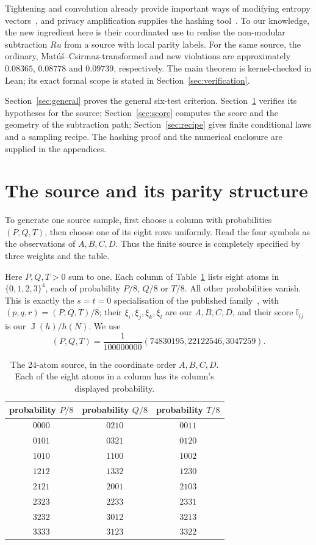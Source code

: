 \documentclass[a4paper,11pt]{article}
\newcommand{\Ing}{\operatorname{J}}
\begin{document}
Tightening and convolution already provide important ways of modifying
entropy vectors~\cite{Matus,MC}, and privacy amplification supplies the
hashing tool~\cite{BBCM,Csiszar96,RW}. To our knowledge, the new ingredient
here is their coordinated use to realise the non-modular subtraction
$Ru$ from a source with local parity labels. For the same source, the
ordinary, Mat\'u\v{s}--Csirmaz-transformed and new violations are
approximately $0.08365$, $0.08778$ and $0.09739$, respectively.
The main theorem is kernel-checked in Lean; its exact formal scope is
stated in Section~\ref{sec:verification}.

Section~\ref{sec:general} proves the general six-test criterion.
Section~\ref{sec:source} verifies its hypotheses for the source;
Section~\ref{sec:score} computes the score and the geometry of the
subtraction path; Section~\ref{sec:recipe} gives finite conditional laws
and a sampling recipe. The hashing proof and the numerical enclosure
are supplied in the appendices.



\section{The source and its parity structure}\label{sec:source}
To generate one source sample, first choose a column with probabilities
$(P,Q,T)$, then choose one of its eight rows uniformly. Read the four
symbols as the observations of $A,B,C,D$. Thus the finite source is
completely specified by three weights and the table.

Here $P,Q,T>0$ sum to one. Each column of Table~\ref{tab:source} lists
eight atoms in $\{0,1,2,3\}^4$, each of probability $P/8$, $Q/8$ or $T/8$.
All other probabilities vanish. This is exactly the
$s=t=0$ specialisation of the published family~\cite[Example~2]{MC}, with
$(p,q,r)=(P,Q,T)/8$; their $\xi_i,\xi_j,\xi_k,\xi_l$ are our $A,B,C,D$,
and their score $\mathbb I_{ij}$ is our $\Ing(h)/h(N)$. We use
\begin{equation}\label{eq:parameters}
 (P,Q,T)=\frac1{100000000}(74830195,22122546,3047259).
\end{equation}
\begin{table}[ht]
\centering
\begin{tabular}{ccc}
\toprule
probability $P/8$ & probability $Q/8$ & probability $T/8$\\
\midrule
$0000$&$0210$&$0011$\\
$0101$&$0321$&$0120$\\
$1010$&$1100$&$1002$\\
$1212$&$1332$&$1230$\\
$2121$&$2001$&$2103$\\
$2323$&$2233$&$2331$\\
$3232$&$3012$&$3213$\\
$3333$&$3123$&$3322$\\
\bottomrule
\end{tabular}
\caption{The 24-atom source, in the coordinate order $A,B,C,D$. Each of the
eight atoms in a column has its column's displayed probability.}
\label{tab:source}
\end{table}
\end{document}
